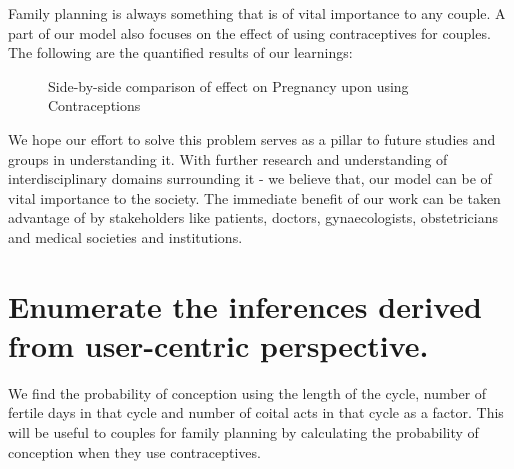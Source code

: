 \documentclass{article}
\begin{document}
Family planning is always something that is of vital importance to any couple. A part of our model also focuses on the effect of using contraceptives for couples. The following are the quantified results of our learnings: \\ 

\begin{figure}[H]%
	\centering
	\qquad
	\caption{Side-by-side comparison of effect on Pregnancy upon using Contraceptions}%
	\label{fig:example}%
\end{figure}

We hope our effort to solve this problem serves as a pillar to future studies and groups in understanding it. With further research and understanding of interdisciplinary domains surrounding it - we believe that, our model can be of vital importance to the society. The immediate benefit of our work can be taken advantage of by stakeholders like patients, doctors, gynaecologists, obstetricians and medical societies and institutions.\\

\section{Enumerate the inferences derived from user-centric perspective.}
We find the probability of conception using the length of the cycle, number of fertile days in that cycle and number of coital acts in that cycle as a factor. This will be useful to couples for family planning by calculating the probability of conception when they use contraceptives.\\
\end{document}
